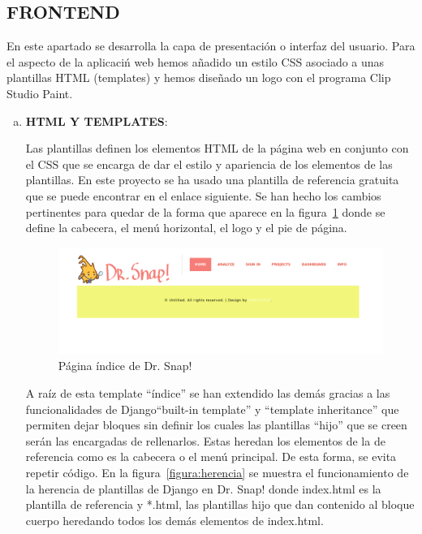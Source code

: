 \documentclass[a4paper, 12pt]{book}
\begin{document}
\subsection{FRONTEND}
En este apartado se desarrolla la capa de presentación o interfaz del usuario. Para el aspecto de la aplicaciń web hemos añadido un estilo CSS asociado a unas plantillas HTML (templates) y hemos diseñado un logo con el programa Clip Studio Paint.
\begin{enumerate}[a)]
    \item \textbf{HTML Y TEMPLATES}:
    
    Las plantillas definen los elementos HTML de la página web en conjunto con el CSS que se encarga de dar el estilo y apariencia de los elementos de las plantillas. En este proyecto se ha usado una plantilla de referencia gratuita que se puede encontrar en el enlace siguiente. Se han hecho los cambios pertinentes para quedar de la forma que aparece en la figura~\ref{figura:index} donde se define la cabecera, el menú horizontal, el logo y el pie de página.\\
    
     \begin{figure}[h]
            \centering
            \includegraphics[scale=0.32]{img/index.png}
            \caption{Página índice de Dr. Snap!}
            \label{figura:index}
        \end{figure}
    
    A raíz de esta template ``índice'' se han extendido las demás gracias a las funcionalidades de Django``built-in template'' y ``template inheritance'' que permiten dejar bloques sin definir los cuales las plantillas ``hijo''  que se creen serán las encargadas de rellenarlos. Estas heredan los elementos de la de referencia como es la cabecera o el menú principal. De esta forma, se evita repetir código. En la figura~\ref{figura:herencia} se muestra el funcionamiento de la herencia de plantillas de Django en Dr. Snap! donde index.html es la plantilla de referencia y *.html, las plantillas hijo que dan contenido al bloque cuerpo heredando todos los demás elementos de index.html.
    

\end{enumerate}
\end{document}
